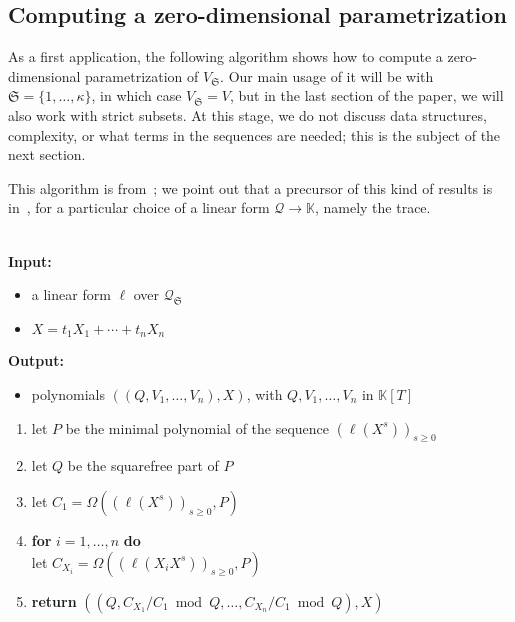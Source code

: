 \documentclass[12pt]{article}
\newcommand{\minpoly}{P}
\newcommand{\lf}{X}
\newcommand{\residueI}{\mathscr{Q}}
\newcommand{\sqfree}{Q}
\def\dg{\kappa}
\def\K{\mathbb{K}}
\def\K {\ensuremath{\mathbb{K}}}
\begin{document}

\subsection{Computing a zero-dimensional parametrization}  \label{ssec:abstractlago}

As a first application, the following algorithm shows how to compute a
zero-dimensional parametrization of $V_{\mathfrak{S}}$. Our main usage
of it will be with $\mathfrak{S}=\{1,\dots,\dg\}$, in which case
$V_{\mathfrak{S}}=V$, but in the last section of the paper, we will
also work with strict subsets. At this stage, we do not discuss data
structures, complexity, or what terms in the sequences are needed;
this is the subject of the next section.

This algorithm is from~\cite{BoSaSc03}; we point out that a precursor
of this kind of results is in~\cite{Rouillier99}, for a particular
choice of a linear form $\residueI\to \K$, namely the trace.

\begin{algorithm}[H]
  \caption{$\mathsf{Parametrization}(\ell,\lf)$}  ~\\
	  {\bf Input:} \vspace{-0.5em}
	  \begin{itemize}\setlength\itemsep{0em}
	  \item  a linear form $\ell$ over $\residueI_\mathfrak{S}$
	  \item $\lf=t_1 X_1 + \cdots + t_n X_n$
	  \end{itemize}
    {\bf Output:}  \vspace{-0.5em}
          \begin{itemize}
          \item              polynomials $((\sqfree,V_1,\dots,V_n),\lf)$, with $\sqfree,V_1,\dots,V_n$ in $\K[T]$
          \end{itemize}
    \begin{enumerate}\setlength\itemsep{0em}
      \item let $\minpoly$ be the minimal polynomial of the sequence $(\ell(\lf^s))_{s \ge 0}$
      \item let $\sqfree$ be the squarefree part of $\minpoly$
      \item let $C_1 = \Omega((\ell(\lf^s))_{s\ge0} ,\minpoly)$
      \item \textbf{for} $i=1,\dots,n$ \textbf{do} \\
            \phantom{for} let $C_{X_i} = \Omega((\ell(X_i \lf^s))_{s\ge0}, \minpoly)$ 
      \item \textbf{return} $((\sqfree, C_{X_1}/ C_1 \bmod \sqfree, \dots, C_{X_n}/ C_{1} \bmod \sqfree),\lf)$
    \end{enumerate}
    \label{algo:para2}
\end{algorithm}
\end{document}

